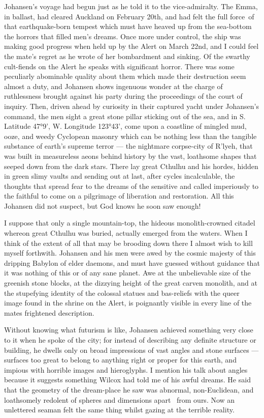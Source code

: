 Johansen's voyage had begun just as he told it to the vice-admiralty.
The Emma, in ballast, had cleared Auckland on February 20th, and had
felt the full force\est\ of that earthquake-born tempest which must have
heaved up from the sea-bottom the horrors that filled men's dreams. Once
more under control, the ship was making good progress when held up by
the Alert on March 22nd, and I could feel the mate's regret as he wrote
of her bombardment and sinking. Of the swarthy cult-fiends on the Alert
he speaks with significant horror. There was some peculiarly abominable
quality about them which made their destruction seem almost a duty, and
Johansen shows ingenuous wonder at the charge of ruthlessness brought
against his party during the proceedings of the court of inquiry. Then,
driven ahead by curiosity in their captured yacht under Johansen's
command, the men sight a great stone pillar sticking out of the sea, and
in S. Latitude 47°9', W. Longitude 123°43', come upon a coastline of
mingled mud, ooze, and weedy Cyclopean masonry which can be nothing less
than the tangible substance of earth's supreme terror --- the nightmare
corpse-city of R'lyeh, that was built in measureless aeons behind
history by the vast, loathsome shapes that seeped down from the dark
stars. There lay great Cthulhu and his hordes, hidden in green slimy
vaults and sending out at last, after cycles incalculable, the thoughts
that spread fear to the dreams of the sensitive and called imperiously
to the faithful to come on a pilgrimage of liberation and restoration.
All this Johansen did not suspect, but God knows he soon saw enough!

I suppose that only a single mountain-top, the hideous monolith-crowned
citadel whereon great Cthulhu was buried, actually emerged from the
waters. When I think of the extent of all that may be brooding down
there I almost wish to kill myself forthwith. Johansen and his men were
awed by the cosmic majesty of this dripping Babylon of elder daemons,
and must have guessed without guidance that it was nothing of this or of
any sane planet. Awe at the unbelievable size of the greenish stone
blocks, at the dizzying height of the great carven monolith, and at the
stupefying identity of the colossal statues and bas-reliefs with the
queer image found in the shrine on the Alert, is poignantly visible in
every line of the mates frightened description.

Without knowing what futurism is like, Johansen achieved something very
close to it when he spoke of the city; for instead of describing any
definite structure or building, he dwells only on broad impressions of
vast angles and stone surfaces --- surfaces too great to belong to
anything right or proper for this earth, and impious with horrible
images and hieroglyphs. I mention his talk about angles because it
suggests something Wilcox had told me of his awful dreams. He said that
the geometry of the dream-place he saw was abnormal, non-Euclidean, and
loathsomely redolent of spheres and dimensions apart \est\ from ours. Now an
unlettered seaman felt the same thing whilst gazing at the terrible
reality.

